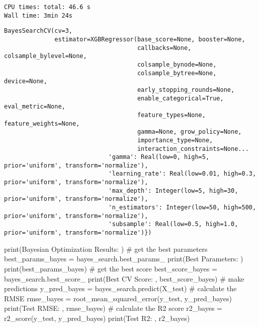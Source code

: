 \documentclass[
  letterpaper,
  DIV=11,
  numbers=noendperiod]{scrreprt}
\newenvironment{Shaded}{\begin{snugshade}}{\end{snugshade}}
\newcommand{\BuiltInTok}[1]{\textcolor[rgb]{0.00,0.23,0.31}{#1}}
\newcommand{\CommentTok}[1]{\textcolor[rgb]{0.37,0.37,0.37}{#1}}
\newcommand{\NormalTok}[1]{\textcolor[rgb]{0.00,0.23,0.31}{#1}}
\newcommand{\OperatorTok}[1]{\textcolor[rgb]{0.37,0.37,0.37}{#1}}
\newcommand{\StringTok}[1]{\textcolor[rgb]{0.13,0.47,0.30}{#1}}
\begin{document}
\begin{verbatim}
CPU times: total: 46.6 s
Wall time: 3min 24s
\end{verbatim}

\begin{verbatim}
BayesSearchCV(cv=3,
              estimator=XGBRegressor(base_score=None, booster=None,
                                     callbacks=None, colsample_bylevel=None,
                                     colsample_bynode=None,
                                     colsample_bytree=None, device=None,
                                     early_stopping_rounds=None,
                                     enable_categorical=True, eval_metric=None,
                                     feature_types=None, feature_weights=None,
                                     gamma=None, grow_policy=None,
                                     importance_type=None,
                                     interaction_constraints=None...
                             'gamma': Real(low=0, high=5, prior='uniform', transform='normalize'),
                             'learning_rate': Real(low=0.01, high=0.3, prior='uniform', transform='normalize'),
                             'max_depth': Integer(low=5, high=30, prior='uniform', transform='normalize'),
                             'n_estimators': Integer(low=50, high=500, prior='uniform', transform='normalize'),
                             'subsample': Real(low=0.5, high=1.0, prior='uniform', transform='normalize')})
\end{verbatim}

\begin{Shaded}
\begin{Highlighting}[]
\BuiltInTok{print}\NormalTok{(}\StringTok{\textquotesingle{}Bayesian Optimization Results: \textquotesingle{}}\NormalTok{)}
\CommentTok{\# get the best parameters}
\NormalTok{best\_params\_bayes }\OperatorTok{=}\NormalTok{ bayes\_search.best\_params\_}
\BuiltInTok{print}\NormalTok{(}\StringTok{\textquotesingle{}Best Parameters: \textquotesingle{}}\NormalTok{)}
\BuiltInTok{print}\NormalTok{(best\_params\_bayes)}
\CommentTok{\# get the best score}
\NormalTok{best\_score\_bayes }\OperatorTok{=}\NormalTok{ bayes\_search.best\_score\_}
\BuiltInTok{print}\NormalTok{(}\StringTok{\textquotesingle{}Best CV Score: \textquotesingle{}}\NormalTok{, best\_score\_bayes)}
\CommentTok{\# make predictions}
\NormalTok{y\_pred\_bayes }\OperatorTok{=}\NormalTok{ bayes\_search.predict(X\_test)}
\CommentTok{\# calculate the RMSE}
\NormalTok{rmse\_bayes }\OperatorTok{=}\NormalTok{ root\_mean\_squared\_error(y\_test, y\_pred\_bayes)}
\BuiltInTok{print}\NormalTok{(}\StringTok{\textquotesingle{}Test RMSE: \textquotesingle{}}\NormalTok{, rmse\_bayes)}
\CommentTok{\# calculate the R2 score}
\NormalTok{r2\_bayes }\OperatorTok{=}\NormalTok{ r2\_score(y\_test, y\_pred\_bayes)}
\BuiltInTok{print}\NormalTok{(}\StringTok{\textquotesingle{}Test R2: \textquotesingle{}}\NormalTok{, r2\_bayes)}

\end{Highlighting}
\end{Shaded}
\end{document}
